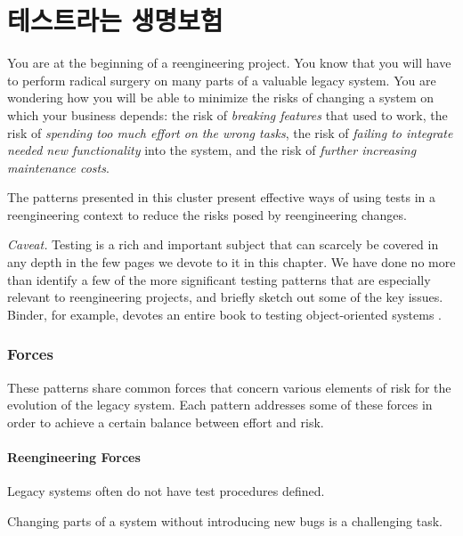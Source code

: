 \documentclass[a4paper,10pt,twoside]{book}
\begin{document}
	\renewcommand{\nnbb}[2]{} %
	\sloppy
\fi
\chapter{테스트라는 생명보험}

You are at the beginning of a reengineering project. You know that you will have to perform radical surgery on many parts of a valuable legacy system. You are wondering how you will be able to minimize the risks of changing a system on which your business depends: the risk of \emph{breaking features} that used to work, the risk of \emph{spending too much effort on the wrong tasks}, the risk of \emph{failing to integrate needed new functionality} into the system, and the risk of \emph{further increasing maintenance costs}.

The patterns presented in this cluster present effective ways of using tests in a reengineering context to reduce the risks posed by reengineering changes.

\noindent
\emph{Caveat.}
Testing is a rich and important subject that can scarcely be covered in any depth in the few pages we devote to it in this chapter. We have done no more than identify a few of the more significant testing patterns that are especially relevant to reengineering projects, and briefly sketch out some of the key issues. Binder, for example, devotes an entire book to testing object-oriented systems \cite{Bind99a}.

\subsection*{Forces}

These patterns share common forces that concern various elements of risk for the evolution of the legacy system. Each pattern addresses some of these forces in order to achieve a certain balance between effort and risk.

\subsubsection*{Reengineering Forces}

\begin{bulletlist}
\item Legacy systems often do not have test procedures defined.

\item Changing parts of a system without introducing new bugs is a challenging task.
\end{bulletlist}
\end{document}
